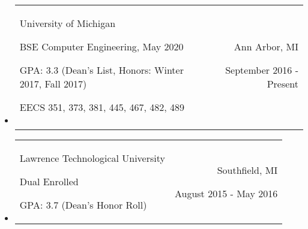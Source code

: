 \documentclass[9pt]{memoir}
\begin{document}
\begin{itemize}

\item

\begin{tabular}[t]{lr}

\begin{minipage}[t]{0.6 \textwidth}
\raggedright

\normalsize
University of Michigan

\small

BSE Computer Engineering, May 2020

GPA: 3.3 (Dean's List, Honors: Winter 2017, Fall 2017)

EECS 351, 373, 381, 445, 467, 482, 489
\end{minipage}

&

\begin{minipage}[t]{0.3 \textwidth}
\raggedleft

\normalsize
Ann Arbor, MI

\small
September 2016 - Present
\end{minipage}

\\ \\

\end{tabular}

\item

\begin{tabular}[t]{lr}

\begin{minipage}[t]{0.6 \textwidth}
\raggedright

\normalsize
Lawrence Technological University

\small

Dual Enrolled

GPA: 3.7 (Dean's Honor Roll)
\end{minipage}

&

\begin{minipage}[t]{0.3 \textwidth}
\raggedleft

\normalsize
Southfield, MI

\small
August 2015 - May 2016
\end{minipage}

\\

\end{tabular}

\end{itemize}
\end{document}
